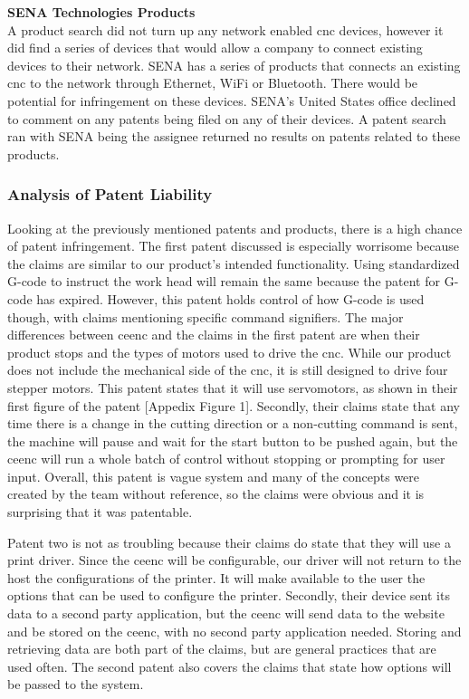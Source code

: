 \textbf{SENA Technologies Products} \\
A product search did not turn up any network enabled \gls{cnc} devices, however it did find a series of devices that would allow a company to connect existing devices to their network.
SENA has a series of products that connects an existing \gls{cnc} to the network through Ethernet, WiFi or Bluetooth.
There would be potential for infringement on these devices.
SENA’s United States office declined to comment on any patents being filed on any of their devices.
A patent search ran with SENA being the assignee returned no results on patents related to these products.

\subsubsection{Analysis of Patent Liability}
Looking at the previously mentioned patents and products, there is a high chance of patent infringement.
The first patent discussed is especially worrisome because the claims are similar to our product's intended functionality.
Using standardized G-code to instruct the work head will remain the same because the patent for G-code has expired.
However, this patent holds control of how G-code is used though, with claims mentioning specific command signifiers.
The major differences between \gls{ceenc} and the claims in the first patent are when their product stops and the types of motors used to drive the \gls{cnc}.
While our product does not include the mechanical side of the \gls{cnc}, it is still designed to drive four stepper motors. 
This patent states that it will use servomotors, as shown in their first figure of the patent [Appedix Figure 1]. 
Secondly, their claims state that any time there is a change in the cutting direction or a non-cutting command is sent, the machine will pause and wait for the start button to be pushed again, but the \gls{ceenc} will run a whole batch of control without stopping or prompting for user input.
Overall, this patent is vague system and many of the concepts were created by the team without reference, so the claims were obvious and it is surprising that it was patentable.

Patent two is not as troubling because their claims do state that they will use a print driver. 
Since the \gls{ceenc} will be configurable, our driver will not return to the host the configurations of the printer.
It will make available to the user the options that can be used to configure the printer.
Secondly, their device sent its data to a second party application, but the \gls{ceenc} will send data to the website and be stored on the \gls{ceenc}, with no second party application needed.
Storing and retrieving data are both part of the claims, but are general practices that are used often.
The second patent also covers the claims that state how options will be passed to the system.

